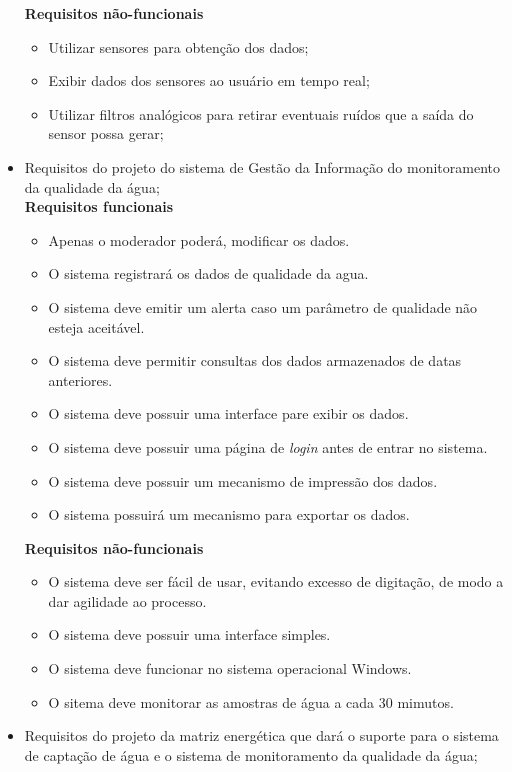 \begin{itemize}
	  \textbf{Requisitos não-funcionais}
	  \begin{itemize}
	   \item Utilizar sensores para obtenção dos dados;
	   \item Exibir dados dos sensores ao usuário em tempo real;
	   \item Utilizar filtros analógicos para retirar eventuais ruídos que a saída do sensor possa gerar;
	  \end{itemize}
	  
	\item Requisitos do projeto do sistema de Gestão da Informação do monitoramento da qualidade da água;\\
	 
	 \textbf{Requisitos funcionais}
	  \begin{itemize}
	   \item Apenas o moderador poderá, modificar os dados.
	   \item O sistema registrará os dados de qualidade da agua.
	   \item O sistema deve emitir um alerta caso um parâmetro de qualidade não esteja aceitável.
	   \item O sistema deve permitir consultas dos dados armazenados de datas anteriores.
	   \item O sistema deve possuir uma interface pare exibir os dados.
	   \item O sistema deve possuir uma página de \textit{login} antes de entrar no sistema.
	   \item O sistema deve possuir um mecanismo de impressão dos dados.
	   \item O sistema possuirá um mecanismo para exportar os dados.
	  \end{itemize}
	  
	  \textbf{Requisitos não-funcionais}
	  \begin{itemize}
	   \item O sistema deve ser fácil de usar, evitando excesso de digitação, de modo a dar agilidade ao processo.
	   \item O sistema deve possuir uma interface simples.
	   \item O sistema deve funcionar no sistema operacional Windows.
	   \item O sitema deve monitorar as amostras de água a cada 30 mimutos.
	  \end{itemize}
	
	\item Requisitos do projeto da matriz energética que dará o suporte para o sistema de captação de água e o sistema de monitoramento da qualidade da água;\\
	

\end{itemize}
